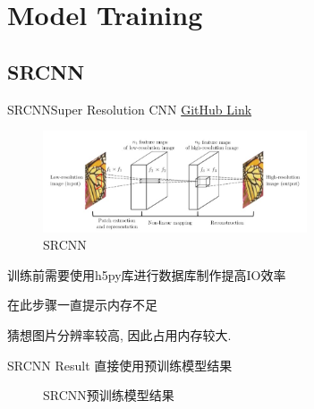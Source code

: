 \section{Model Training}

\subsection{SRCNN}
\begin{frame}{SRCNN}{Super Resolution CNN \href{https://github.com/yjn870/SRCNN-pytorch}{GitHub Link}}
    
    \begin{figure}
        \centering
        \includegraphics[height=3cm]{pic/pic0101.jpg}
        \caption{SRCNN}
        \label{fig:0101}
    \end{figure}

    训练前需要使用h5py库进行数据库制作提高IO效率

    在此步骤一直提示内存不足
    
    猜想图片分辨率较高, 因此占用内存较大.
\end{frame}

\begin{frame}{SRCNN Result}
    \small 直接使用预训练模型结果
    \begin{figure}[!htbp]
        \centering
        \quad
        \caption{SRCNN预训练模型结果}
        \label{fig:0102}
    \end{figure}
    
\end{frame}

